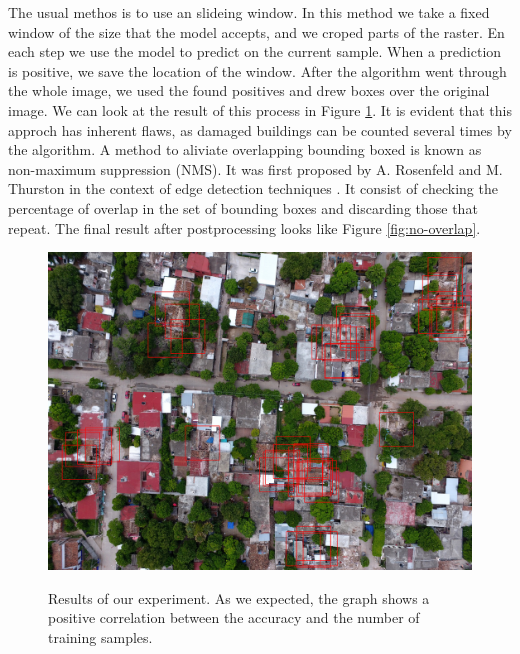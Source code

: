 The usual methos is to use an slideing window. In this method we take a fixed window of the size that the model accepts, and we croped parts of the raster. En each step we use the model to predict on the current sample. When a prediction is positive, we save the location of the window. After the algorithm went through the whole image, we used the found positives and drew boxes over the original image. We can look at the result of this process in Figure \ref{fig:overlap}. It is evident that this approch has inherent flaws, as damaged buildings can be counted several times by the algorithm. A method to aliviate overlapping bounding boxed is known as non-maximum suppression (NMS). It was first proposed by A. Rosenfeld and M. Thurston in the context of edge detection techniques \cite{1671883}. It consist of checking the percentage of overlap in the set of bounding boxes and discarding those that repeat. The final result after postprocessing looks like Figure \ref{fig:no-overlap}.

\begin{figure}[h]
  \centering
  \includegraphics[width=\textwidth]{images/overlap.jpg}
  \label{fig:overlap}
  \caption{Results of our experiment. As we expected, the graph shows a positive correlation between the accuracy and the number of training samples.}
\end{figure}


